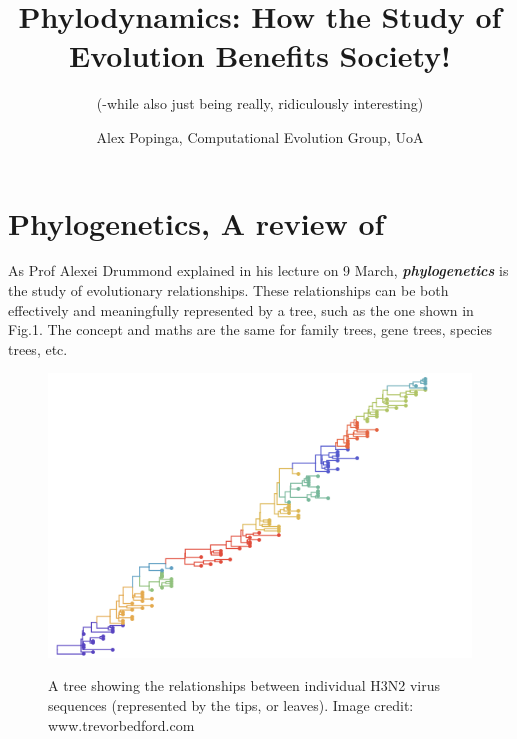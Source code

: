 \documentclass{scrartcl}
\begin{document}
\title{Phylodynamics:  How the Study of Evolution Benefits Society!}

\subtitle{(-while also just being really, ridiculously interesting)}
\author{Alex Popinga, Computational Evolution Group, UoA}
\date{}
\maketitle

\section{Phylogenetics, A review of}

As Prof Alexei Drummond explained in his lecture on 9 March, \textbf{\textit{phylogenetics}} is the study of evolutionary relationships.  
These relationships can be both effectively and meaningfully represented by a tree, such as the one shown in Fig.1.
The concept and maths are the same for family trees, gene trees, species trees, etc.  

\begin{figure}[H] 
\center
{\includegraphics[width=0.7\linewidth]{tree.png}}
\caption{A tree showing the relationships between individual H3N2 virus sequences (represented by the tips, or leaves). Image credit: www.trevorbedford.com}
\label{tree}
\end{figure}

\vspace{2mm}
\end{document}
